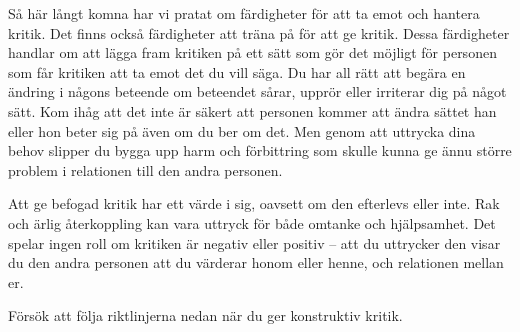 \documentclass[swedish,a4paper]{book}
\begin{document}
Så här långt komna har vi pratat om färdigheter för att ta emot och hantera kritik. Det finns också färdigheter att träna på för att ge kritik. Dessa färdigheter handlar om att lägga fram kritiken på ett sätt som gör det möjligt för personen som får kritiken att ta emot det du vill säga. Du har all rätt att begära en ändring i någons beteende om beteendet sårar, upprör eller irriterar dig på något sätt. Kom ihåg att det inte är säkert att personen kommer att ändra sättet han eller hon beter sig på även om du ber om det. Men genom att uttrycka dina behov slipper du bygga upp harm och förbittring som skulle kunna ge ännu större problem i relationen till den andra personen. 

Att ge befogad kritik har ett värde i sig, oavsett om den efterlevs eller inte. Rak och ärlig återkoppling kan vara uttryck för både omtanke och hjälpsamhet. Det spelar ingen roll om kritiken är negativ eller positiv -- att du uttrycker den visar du den andra personen att du värderar honom eller henne, och relationen mellan er.

Försök att följa riktlinjerna nedan när du ger konstruktiv kritik.

\end{document}
